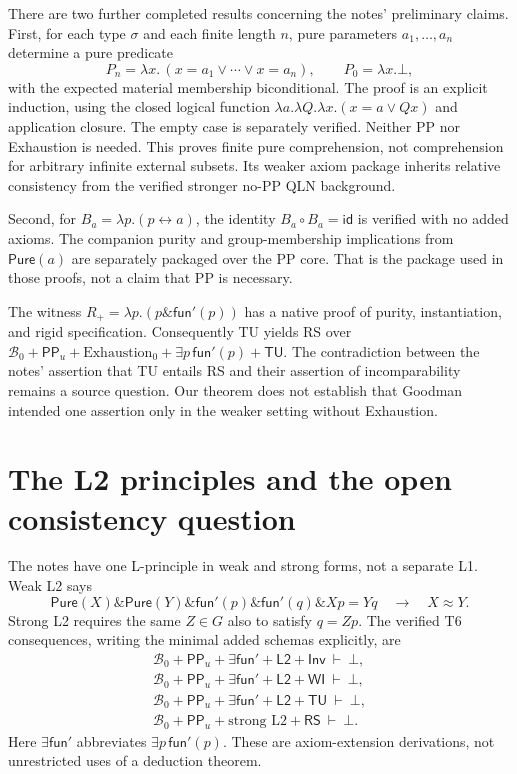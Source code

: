 \documentclass[12pt,leqno]{article}
\newcommand{\AND}{\ensuremath{\mathbin{\&}}}
\newcommand{\OR}{\ensuremath{\vee}}
\newcommand{\IFF}{\ensuremath{\leftrightarrow}}
\newcommand{\IC}{\ensuremath{\rightarrow}}
\newcommand{\Pure}{\mathsf{Pure}}
\newcommand{\funp}{\mathsf{fun}'}
\newcommand{\PP}{\mathsf{PP}}
\newcommand{\Ltwo}{\mathsf{L2}}
\newcommand{\Inv}{\mathsf{Inv}}
\newcommand{\WI}{\mathsf{WI}}
\newcommand{\TU}{\mathsf{TU}}
\newcommand{\RS}{\mathsf{RS}}
\newcommand{\id}{\mathsf{id}}
\newcommand{\Bmin}{\mathcal B_0}
\begin{document}
There are two further completed results concerning the notes' preliminary
claims. First, for each type $\sigma$ and each finite length $n$, pure
parameters $a_1,\ldots,a_n$ determine a pure predicate
\[
 P_n=\lambda x.\,(x=a_1\OR\cdots\OR x=a_n),
 \qquad P_0=\lambda x.\bot,
\]
with the expected material membership biconditional. The proof is an
explicit induction, using the closed logical function
$\lambda a.\lambda Q.\lambda x.(x=a\OR Qx)$ and application closure.
The empty case is separately verified. Neither PP nor Exhaustion is needed.
This proves finite pure comprehension, not comprehension for arbitrary
infinite external subsets. Its weaker axiom package inherits relative
consistency from the verified stronger no-PP QLN background.

Second, for $B_a=\lambda p.(p\IFF a)$, the identity
$B_a\circ B_a=\id$ is verified with no added axioms. The companion
purity and group-membership implications from $\Pure(a)$ are separately
packaged over the PP core. That is the package used in those proofs, not
a claim that PP is necessary.

The witness $R_+=\lambda p.(p\AND\funp(p))$ has a native proof of
purity, instantiation, and rigid specification. Consequently TU yields RS
over $\Bmin+\PP_u+\mathrm{Exhaustion}_0+\exists p\,\funp(p)+\TU$.
The contradiction between the notes' assertion that TU entails RS and their
assertion of incomparability remains a source question. Our theorem does
not establish that Goodman intended one assertion only in the weaker
setting without Exhaustion.

\section{The L2 principles and the open consistency question}
\label{sec:l2}

The notes have one L-principle in weak and strong forms, not a separate L1.
Weak L2 says
\[
 \Pure(X)\AND\Pure(Y)\AND\funp(p)\AND\funp(q)\AND Xp=Yq
 \quad\IC\quad X\approx Y.
\]
Strong L2 requires the same $Z\in G$ also to satisfy $q=Zp$.
The verified T6 consequences, writing the minimal added schemas explicitly,
are
\[
\begin{array}{l}
 \Bmin+\PP_u+\exists\funp+\Ltwo+\Inv\ \vdash\ \bot,\\
 \Bmin+\PP_u+\exists\funp+\Ltwo+\WI\ \vdash\ \bot,\\
 \Bmin+\PP_u+\exists\funp+\Ltwo+\TU\ \vdash\ \bot,\\
 \Bmin+\PP_u+\text{strong L2}+\RS\ \vdash\ \bot.
\end{array}
\]
Here $\exists\funp$ abbreviates $\exists p\,\funp(p)$. These are
axiom-extension derivations, not unrestricted uses of a deduction theorem.
\end{document}

